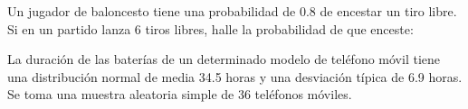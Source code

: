 \documentclass[addpoints,spanish, 12pt,a4paper]{exam}
\renewcommand*\half{.5}
\begin{document}
\begin{questions}

\question[2\half] Un jugador de baloncesto tiene una probabilidad de 0.8 de encestar un tiro libre. Si en un partido lanza 6 tiros libres, halle la probabilidad de que enceste: 

\question[2\half] La duración de las baterías de un determinado modelo de teléfono móvil tiene una distribución normal de media 34.5 horas y una desviación típica de 6.9 horas. Se toma una muestra aleatoria simple de 36 teléfonos móviles.
\begin{parts}

\end{parts}
\end{questions}
\end{document}
